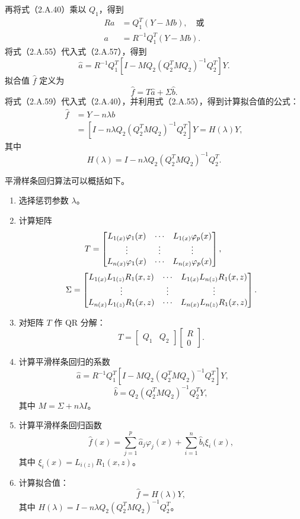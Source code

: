 再将式（2.A.40）乘以 $Q_1$，得到
\begin{equation}
\begin{aligned}
Ra&=Q_1^T(Y-Mb),\quad\text{或}\\
a&=R^{-1}Q_1^T(Y-Mb).
\end{aligned}\tag{2.A57}
\end{equation}
将式（2.A.55）代入式（2.A.57），得到
\begin{equation}
\widehat a=R^{-1}Q_1^T
 \left[I-MQ_2(Q_2^TMQ_2)^{-1}Q_2^T\right]Y.\tag{2.A.58}
\end{equation}
拟合值 $\widehat f$ 定义为
\begin{equation}
\widehat f=T\widehat a+\Sigma\widehat b.\tag{2.A.59}
\end{equation}
将式（2.A.59）代入式（2.A.40），并利用式（2.A.55），得到计算拟合值的公式：
\begin{equation}
\begin{aligned}
\widehat f&=Y-n\lambda b\\
 &=\left[I-n\lambda Q_2(Q_2^TMQ_2)^{-1}Q_2^T\right]Y
 =H(\lambda)Y,
\end{aligned}\tag{2.A.60}
\end{equation}
其中
\begin{equation}
H(\lambda)=I-n\lambda Q_2(Q_2^TMQ_2)^{-1}Q_2^T.\tag{2.A.61}
\end{equation}

平滑样条回归算法可以概括如下。
\begin{enumerate}
\item 选择惩罚参数 $\lambda$。
\item 计算矩阵
\[
T=\begin{bmatrix} L_{1(x)}\varphi_1(x)&\cdots&L_{1(x)}\varphi_p(x)\\ \vdots&\vdots&\vdots\\ L_{n(x)}\varphi_1(x)&\cdots&L_{n(x)}\varphi_p(x) \end{bmatrix},\qquad
\]
\[
\Sigma=\begin{bmatrix} L_{1(x)}L_{1(z)}R_1(x,z)&\cdots&L_{1(x)}L_{n(z)}R_1(x,z)\\ \vdots&\vdots&\vdots\\ L_{n(x)}L_{1(z)}R_1(x,z)&\cdots&L_{n(x)}L_{n(z)}R_1(x,z) \end{bmatrix}.
\]
\item 对矩阵 $T$ 作 QR 分解：
\[
T=\begin{bmatrix}Q_1&Q_2\end{bmatrix}\begin{bmatrix}R\\0\end{bmatrix}.
\]
\item 计算平滑样条回归的系数
\[
\widehat a=R^{-1}Q_1^T
 \left[I-MQ_2(Q_2^TMQ_2)^{-1}Q_2^T\right]Y,
\qquad
\]
\[
\widehat b=Q_2(Q_2^TMQ_2)^{-1}Q_2^TY,
\]
其中 $M=\Sigma+n\lambda I$。
\item 计算平滑样条回归函数
\[
\widehat f(x)=\sum_{j=1}^p\widehat a_j\varphi_j(x)
 +\sum_{i=1}^n\widehat b_i\xi_i(x),
\]
其中 $\xi_i(x)=L_{i(z)}R_1(x,z)$。
\item 计算拟合值：
\[
\widehat f=H(\lambda)Y,
\]
其中 $H(\lambda)=I-n\lambda Q_2(Q_2^TMQ_2)^{-1}Q_2^T$。
\end{enumerate}

